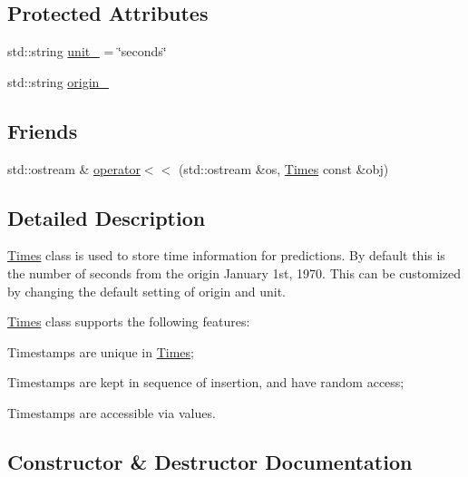 \subsection*{Protected Attributes}
\begin{DoxyCompactItemize}
\item 
std\+::string \mbox{\hyperlink{classanen_time_1_1_times_a1bc1f74d961af9efa6462b2cbe5f3718}{unit\+\_\+}} = \char`\"{}seconds\char`\"{}
\item 
std\+::string \mbox{\hyperlink{classanen_time_1_1_times_a7e08602fb0628df1c5f1cccbb98baeb1}{origin\+\_\+}}
\end{DoxyCompactItemize}
\subsection*{Friends}
\begin{DoxyCompactItemize}
\item 
std\+::ostream \& \mbox{\hyperlink{classanen_time_1_1_times_a0c37c7d9833e9b02d1a219555f55fe34}{operator$<$$<$}} (std\+::ostream \&os, \mbox{\hyperlink{classanen_time_1_1_times}{Times}} const \&obj)
\end{DoxyCompactItemize}


\subsection{Detailed Description}
\mbox{\hyperlink{classanen_time_1_1_times}{Times}} class is used to store time information for predictions. By default this is the number of seconds from the origin January 1st, 1970. This can be customized by changing the default setting of origin and unit. 

\mbox{\hyperlink{classanen_time_1_1_times}{Times}} class supports the following features\+:
\begin{DoxyEnumerate}
\item Timestamps are unique in \mbox{\hyperlink{classanen_time_1_1_times}{Times}};
\item Timestamps are kept in sequence of insertion, and have random access;
\item Timestamps are accessible via values. 
\end{DoxyEnumerate}

\subsection{Constructor \& Destructor Documentation}
\mbox{\label{classanen_time_1_1_times_a8ba246100f3c12f80abeb3beb93446f6}} 
